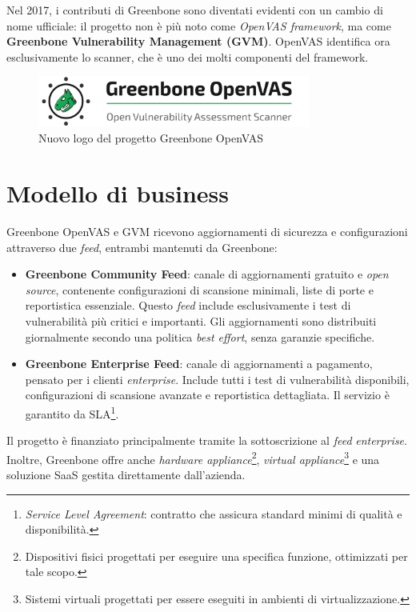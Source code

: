 Nel 2017, i contributi di Greenbone sono diventati evidenti con un cambio di nome ufficiale: il progetto non è più noto come \emph{OpenVAS framework}, ma come \textbf{Greenbone Vulnerability Management (GVM)}. OpenVAS identifica ora esclusivamente lo scanner, che è uno dei molti componenti del framework.

\begin{figure}
    \centering
    \includegraphics[width=0.8\textwidth]{img/greenbone_logo.png}
    \caption{Nuovo logo del progetto Greenbone OpenVAS}
\end{figure}

\section{Modello di business}
Greenbone OpenVAS e GVM ricevono aggiornamenti di sicurezza e configurazioni attraverso due \emph{feed}, entrambi mantenuti da Greenbone:
\label{feed}

\begin{itemize}
    \item \textbf{Greenbone Community Feed}: canale di aggiornamenti gratuito e \emph{open source}, contenente configurazioni di scansione minimali, liste di porte e reportistica essenziale. Questo \emph{feed} include esclusivamente i test di vulnerabilità più critici e importanti. Gli aggiornamenti sono distribuiti giornalmente secondo una politica \emph{best effort}, senza garanzie specifiche.
    \item \textbf{Greenbone Enterprise Feed}: canale di aggiornamenti a pagamento, pensato per i clienti \emph{enterprise}. Include tutti i test di vulnerabilità disponibili, configurazioni di scansione avanzate e reportistica dettagliata. Il servizio è garantito da SLA\footnote{\emph{Service Level Agreement}: contratto che assicura standard minimi di qualità e disponibilità.}.
\end{itemize}

Il progetto è finanziato principalmente tramite la sottoscrizione al \emph{feed} \emph{enterprise}. Inoltre, Greenbone offre anche \emph{hardware appliance}\footnote{Dispositivi fisici progettati per eseguire una specifica funzione, ottimizzati per tale scopo.}, \emph{virtual appliance}\footnote{Sistemi virtuali progettati per essere eseguiti in ambienti di virtualizzazione.} e una soluzione SaaS gestita direttamente dall'azienda.

